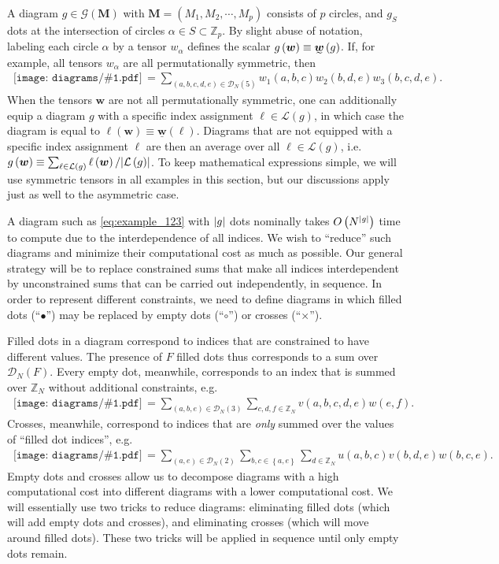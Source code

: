 \documentclass[nofootinbib,notitlepage,11pt]{revtex4-2}
\newcommand{\p}[1]{\left(#1\right)} %
\renewcommand{\set}[1]{\left\{#1\right\}} %
\newcommand{\m}{\bm} %
\newcommand{\1}{\mathds{1}}
\newcommand{\D}{\mathcal{D}}
\newcommand{\G}{\mathcal{G}}
\renewcommand{\L}{\mathcal{L}}
\newcommand{\ZZ}{\mathbb{Z}}
\newcommand{\ut}{\undertilde}
\newcommand{\col}{\underline}
\newcommand{\diagram}[1]
{\,\texttt{[image: diagrams/\#1.pdf]}\,}
\begin{document}
A diagram $g\in\G\p{\m M}$ with $\m M=\p{M_1,M_2,\cdots,M_p}$ consists
of $p$ circles, and $g_S$ dots at the intersection of circles
$\alpha\in S\subset\ZZ_p$.  By slight abuse of notation, labeling each
circle $\alpha$ by a tensor $w_\alpha$ defines the scalar
$g\p{\m w}\equiv\ut{\m w}\p{g}$.  If, for example, all tensors
$w_\alpha$ are all permutationally symmetric, then
\begin{align}
  \diagram{example_w123}
  = \sum_{\p{a,b,c,d,e}\in\D_N\p{5}}
  w_1\p{a,b,c} w_2\p{b,d,e} w_3\p{b,c,d,e}.
  \label{eq:example_123}
\end{align}
When the tensors $\m w$ are not all permutationally symmetric, one can
additionally equip a diagram $g$ with a specific index assignment
$\ell\in\L\p{g}$, in which case the diagram is equal to
$\ell\p{\m w}\equiv\col{\m w}\p{\ell}$.  Diagrams that are not
equipped with a specific index assignment $\ell$ are then an average
over all $\ell\in\L\p{g}$,
i.e.~$g\p{\m w}\equiv\sum_{\ell\in\L\p{g}} \ell\p{\m w} /
\abs{\L\p{g}}$.  To keep mathematical expressions simple, we will use
symmetric tensors in all examples in this section, but our discussions
apply just as well to the asymmetric case.

A diagram such as \eqref{eq:example_123} with $\abs{g}$ dots nominally
takes $O\p{N^{\abs{g}}}$ time to compute due to the interdependence of
all indices.  We wish to ``reduce'' such diagrams and minimize their
computational cost as much as possible.  Our general strategy will be
to replace constrained sums that make all indices interdependent by
unconstrained sums that can be carried out independently, in sequence.
In order to represent different constraints, we need to define
diagrams in which filled dots (``$\bullet$'') may be replaced by empty
dots (``$\circ$'') or crosses (``$\bm\times$'').

Filled dots in a diagram correspond to indices that are constrained to
have different values.  The presence of $F$ filled dots thus
corresponds to a sum over $\D_N\p{F}$.  Every empty dot, meanwhile,
corresponds to an index that is summed over $\ZZ_N$ without additional
constraints, e.g.
\begin{align}
  \diagram{example_o}
  = \sum_{\p{a,b,e}\in\D_N\p{3}} \sum_{c,d,f\in\ZZ_N}
  v\p{a,b,c,d,e} w\p{e,f}.
\end{align}
Crosses, meanwhile, correspond to indices that are {\it only} summed
over the values of ``filled dot indices'', e.g.
\begin{align}
  \diagram{example_x}
  = \sum_{\p{a,e}\in\D_N\p{2}} \sum_{b,c\in\set{a,e}} \sum_{d\in\ZZ_N}
  u\p{a,b,c} v\p{b,d,e} w\p{b,c,e}.
\end{align}
Empty dots and crosses allow us to decompose diagrams with a high
computational cost into different diagrams with a lower computational
cost.  We will essentially use two tricks to reduce diagrams:
eliminating filled dots (which will add empty dots and crosses), and
eliminating crosses (which will move around filled dots).  These two
tricks will be applied in sequence until only empty dots remain.
\end{document}

